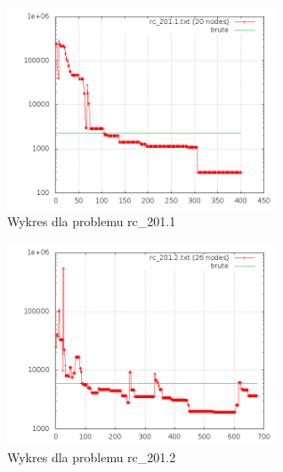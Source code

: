 \begin{frame}{}
    \begin{figure}
        \centering
        \includegraphics[width=8cm]{charts/rc_201_1.png}
        \caption{Wykres dla problemu rc\_201.1}
    \end{figure}
\end{frame}

\begin{frame}{}
    \begin{figure}
        \centering
        \includegraphics[width=8cm]{charts/rc_201_2.png}
        \caption{Wykres dla problemu rc\_201.2}
    \end{figure}
\end{frame}
